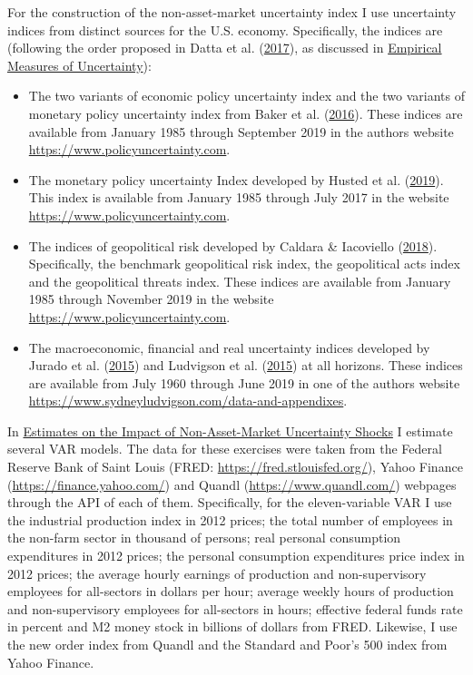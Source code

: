 \documentclass[12pt,twoside]{reedthesis}
\providecommand{\tightlist}{%
  \setlength{\itemsep}{0pt}\setlength{\parskip}{0pt}}
\begin{document}
For the construction of the non-asset-market uncertainty index I use uncertainty indices from distinct sources for the U.S. economy. Specifically, the indices are (following the order proposed in Datta et al. (\protect\hyperlink{ref-dattetal:2017}{2017}), as discussed in \protect\hyperlink{empirical-measures-of-uncertainty}{Empirical Measures of Uncertainty}):
\begin{itemize}
\tightlist
\item
  The two variants of economic policy uncertainty index and the two variants of monetary policy uncertainty index from Baker et al. (\protect\hyperlink{ref-bakeetal:2016}{2016}). These indices are available from January 1985 through September 2019 in the authors website \url{https://www.policyuncertainty.com}.
\item
  The monetary policy uncertainty Index developed by Husted et al. (\protect\hyperlink{ref-hustetal:2019}{2019}). This index is available from January 1985 through July 2017 in the website \url{https://www.policyuncertainty.com}.
\item
  The indices of geopolitical risk developed by Caldara \& Iacoviello (\protect\hyperlink{ref-caldiaco:2018}{2018}). Specifically, the benchmark geopolitical risk index, the geopolitical acts index and the geopolitical threats index. These indices are available from January 1985 through November 2019 in the website \url{https://www.policyuncertainty.com}.
\item
  The macroeconomic, financial and real uncertainty indices developed by Jurado et al. (\protect\hyperlink{ref-juraetal:2015}{2015}) and Ludvigson et al. (\protect\hyperlink{ref-ludvetal:2015}{2015}) at all horizons. These indices are available from July 1960 through June 2019 in one of the authors website \url{https://www.sydneyludvigson.com/data-and-appendixes}.
\end{itemize}
In \protect\hyperlink{estimates-on-the-impact-of-non-asset-market-uncertainty-shocks}{Estimates on the Impact of Non-Asset-Market Uncertainty Shocks} I estimate several VAR models. The data for these exercises were taken from the Federal Reserve Bank of Saint Louis (FRED: \url{https://fred.stlouisfed.org/}), Yahoo Finance (\url{https://finance.yahoo.com/}) and Quandl (\url{https://www.quandl.com/}) webpages through the API of each of them. Specifically, for the eleven-variable VAR I use the industrial production index in 2012 prices; the total number of employees in the non-farm sector in thousand of persons; real personal consumption expenditures in 2012 prices; the personal consumption expenditures price index in 2012 prices; the average hourly earnings of production and non-supervisory employees for all-sectors in dollars per hour; average weekly hours of production and non-supervisory employees for all-sectors in hours; effective federal funds rate in percent and M2 money stock in billions of dollars from FRED. Likewise, I use the new order index from Quandl and the Standard and Poor's 500 index from Yahoo Finance.
\end{document}
